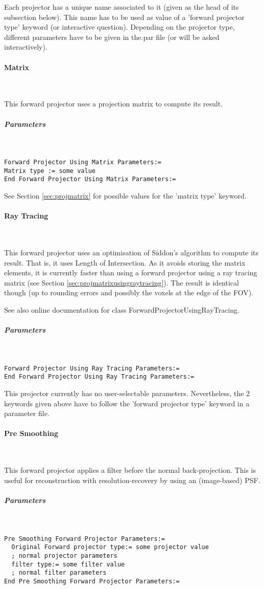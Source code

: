 \documentclass{article}
\newcommand{\subsubsubsection}[1]{\paragraph{#1}\mbox{} \\}
\newcommand{\subsubsubsubsection}[1]{\subparagraph{#1} \mbox{} \\}
\begin{document}
{{{Each projector has a unique name associated to it (given as the 
head of its subsection below). This name has to be used as value 
of a 'forward projector type' keyword (or interactive question). 
Depending on the projector type, different parameters have to 
be given in the.par file (or will be asked interactively).

{ \subsubsubsection{Matrix}
}
This forward projector uses a projection matrix to compute its 
result.

{ \subsubsubsubsection{Parameters}
}
\begin{verbatim}
Forward Projector Using Matrix Parameters:=
Matrix type := some value
End Forward Projector Using Matrix Parameters:=
\end{verbatim}

See Section \ref{sec:projmatrix} for possible values for the 'matrix type' keyword.

{ \subsubsubsection{Ray Tracing}
}
This forward projector uses an optimisation of Siddon's algorithm 
to compute its result. That is, it uses Length of Intersection. 
As it avoids storing the matrix elements, it is currently faster 
than using a forward projector using a ray tracing matrix (see 
Section \ref{sec:projmatrixusingraytracing}). The result is identical though (up to rounding 
errors and possibly the voxels at the edge of the FOV).


See also online documentation for class ForwardProjectorUsingRayTracing.

{ \subsubsubsubsection{Parameters}
}
\begin{verbatim}
Forward Projector Using Ray Tracing Parameters:=
End Forward Projector Using Ray Tracing Parameters:=
\end{verbatim}

This projector currently has no user-selectable parameters. Nevertheless, 
the 2 keywords given above have to follow the 'forward projector 
type' keyword in a parameter file.

{ \subsubsubsection{Pre Smoothing}
}
This forward projector applies a filter before the normal back-projection.
This is useful for reconstruction with resolution-recovery 
by using an (image-based) PSF.

{ \subsubsubsubsection{Parameters}
}
\begin{verbatim}
Pre Smoothing Forward Projector Parameters:=
  Original Forward projector type:= some projector value 
  ; normal projector parameters
  filter type:= some filter value
  ; normal filter parameters
End Pre Smoothing Forward Projector Parameters:=
\end{verbatim}

}}}
\end{document}
